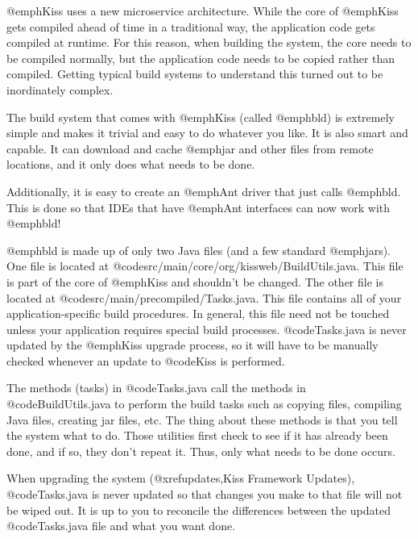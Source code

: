@emph{Kiss} uses a new microservice architecture.  While the core of
@emph{Kiss} gets compiled ahead of time in a traditional way, the
application code gets compiled at runtime.  For this reason, when
building the system, the core needs to be compiled normally, but the
application code needs to be copied rather than compiled.  Getting
typical build systems to understand this turned out to be inordinately
complex.

The build system that comes with @emph{Kiss} (called @emph{bld}) is
extremely simple and makes it trivial and easy to do whatever you
like.  It is also smart and capable.  It can download and cache
@emph{jar} and other files from remote locations, and it only does what
needs to be done.

Additionally, it is easy to create an @emph{Ant} driver that just calls 
@emph{bld}.  This is done so that IDEs that have @emph{Ant} interfaces
can now work with @emph{bld}!

@emph{bld} is made up of only two Java files (and a few standard
@emph{jars}). One file is located at @code{src/main/core/org/kissweb/BuildUtils.java}.
This file is part of the core of @emph{Kiss} and shouldn't be changed.
The other file is located at @code{src/main/precompiled/Tasks.java}.
This file contains all of your application-specific build procedures.
In general, this file need not be touched unless your application requires
special build processes.  @code{Tasks.java} is never updated by the
@emph{Kiss} upgrade process, so it will have to be manually checked whenever an
update to @code{Kiss} is performed.

The methods (tasks) in @code{Tasks.java} call the methods in
@code{BuildUtils.java} to perform the build tasks such as copying
files, compiling Java files, creating jar files, etc.  The thing about
these methods is that you tell the system what to do.  Those utilities
first check to see if it has already been done, and if so, they don't
repeat it.  Thus, only what needs to be done occurs.

When upgrading the system (@xref{updates,Kiss Framework Updates}),
@code{Tasks.java} is never updated so that changes you make to that
file will not be wiped out.  It is up to you to reconcile the
differences between the updated @code{Tasks.java} file and what you
want done.
